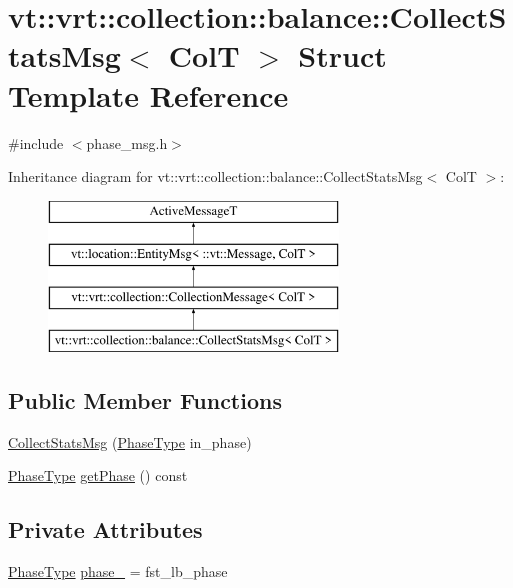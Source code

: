 \hypertarget{structvt_1_1vrt_1_1collection_1_1balance_1_1_collect_stats_msg}{}\section{vt\+:\+:vrt\+:\+:collection\+:\+:balance\+:\+:Collect\+Stats\+Msg$<$ ColT $>$ Struct Template Reference}
\label{structvt_1_1vrt_1_1collection_1_1balance_1_1_collect_stats_msg}


{\ttfamily \#include $<$phase\+\_\+msg.\+h$>$}

Inheritance diagram for vt\+:\+:vrt\+:\+:collection\+:\+:balance\+:\+:Collect\+Stats\+Msg$<$ ColT $>$\+:\begin{figure}[H]
\begin{center}
\leavevmode
\includegraphics[height=4.000000cm]{structvt_1_1vrt_1_1collection_1_1balance_1_1_collect_stats_msg}
\end{center}
\end{figure}
\subsection*{Public Member Functions}
\begin{DoxyCompactItemize}
\item 
\hyperlink{structvt_1_1vrt_1_1collection_1_1balance_1_1_collect_stats_msg_a28adfa6a5327f3c41e9e2cacb39f794b}{Collect\+Stats\+Msg} (\hyperlink{namespacevt_a46ce6733d5cdbd735d561b7b4029f6d7}{Phase\+Type} in\+\_\+phase)
\item 
\hyperlink{namespacevt_a46ce6733d5cdbd735d561b7b4029f6d7}{Phase\+Type} \hyperlink{structvt_1_1vrt_1_1collection_1_1balance_1_1_collect_stats_msg_abf9f2c61e673905a9d97d6de42a009e5}{get\+Phase} () const
\end{DoxyCompactItemize}
\subsection*{Private Attributes}
\begin{DoxyCompactItemize}
\item 
\hyperlink{namespacevt_a46ce6733d5cdbd735d561b7b4029f6d7}{Phase\+Type} \hyperlink{structvt_1_1vrt_1_1collection_1_1balance_1_1_collect_stats_msg_a968baac6bc7d2bc23d48053c887d194a}{phase\+\_\+} = fst\+\_\+lb\+\_\+phase
\end{DoxyCompactItemize}
